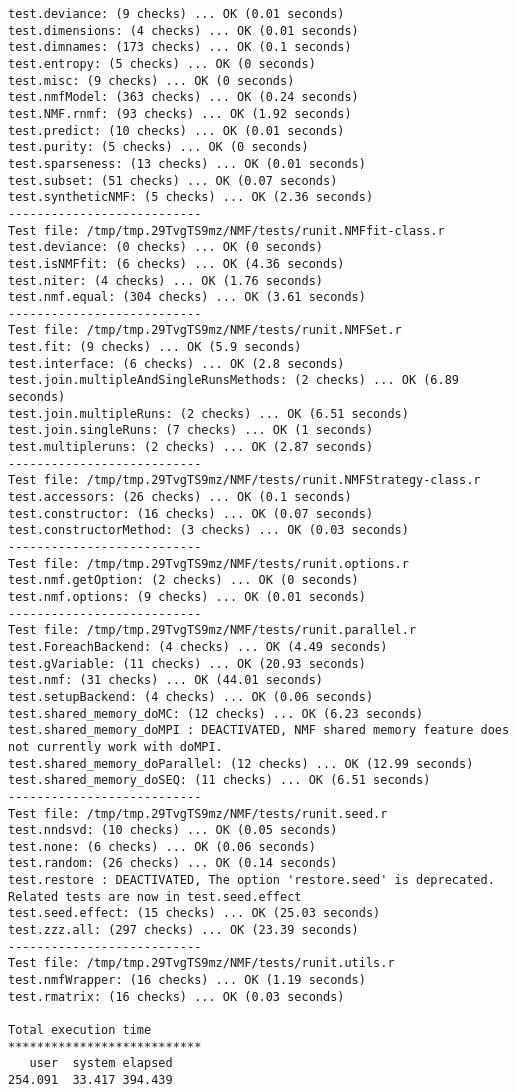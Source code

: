 \documentclass[10pt]{article}
\begin{document}
\begin{verbatim}
test.deviance: (9 checks) ... OK (0.01 seconds)
test.dimensions: (4 checks) ... OK (0.01 seconds)
test.dimnames: (173 checks) ... OK (0.1 seconds)
test.entropy: (5 checks) ... OK (0 seconds)
test.misc: (9 checks) ... OK (0 seconds)
test.nmfModel: (363 checks) ... OK (0.24 seconds)
test.NMF.rnmf: (93 checks) ... OK (1.92 seconds)
test.predict: (10 checks) ... OK (0.01 seconds)
test.purity: (5 checks) ... OK (0 seconds)
test.sparseness: (13 checks) ... OK (0.01 seconds)
test.subset: (51 checks) ... OK (0.07 seconds)
test.syntheticNMF: (5 checks) ... OK (2.36 seconds)
--------------------------- 
Test file: /tmp/tmp.29TvgTS9mz/NMF/tests/runit.NMFfit-class.r 
test.deviance: (0 checks) ... OK (0 seconds)
test.isNMFfit: (6 checks) ... OK (4.36 seconds)
test.niter: (4 checks) ... OK (1.76 seconds)
test.nmf.equal: (304 checks) ... OK (3.61 seconds)
--------------------------- 
Test file: /tmp/tmp.29TvgTS9mz/NMF/tests/runit.NMFSet.r 
test.fit: (9 checks) ... OK (5.9 seconds)
test.interface: (6 checks) ... OK (2.8 seconds)
test.join.multipleAndSingleRunsMethods: (2 checks) ... OK (6.89 seconds)
test.join.multipleRuns: (2 checks) ... OK (6.51 seconds)
test.join.singleRuns: (7 checks) ... OK (1 seconds)
test.multipleruns: (2 checks) ... OK (2.87 seconds)
--------------------------- 
Test file: /tmp/tmp.29TvgTS9mz/NMF/tests/runit.NMFStrategy-class.r 
test.accessors: (26 checks) ... OK (0.1 seconds)
test.constructor: (16 checks) ... OK (0.07 seconds)
test.constructorMethod: (3 checks) ... OK (0.03 seconds)
--------------------------- 
Test file: /tmp/tmp.29TvgTS9mz/NMF/tests/runit.options.r 
test.nmf.getOption: (2 checks) ... OK (0 seconds)
test.nmf.options: (9 checks) ... OK (0.01 seconds)
--------------------------- 
Test file: /tmp/tmp.29TvgTS9mz/NMF/tests/runit.parallel.r 
test.ForeachBackend: (4 checks) ... OK (4.49 seconds)
test.gVariable: (11 checks) ... OK (20.93 seconds)
test.nmf: (31 checks) ... OK (44.01 seconds)
test.setupBackend: (4 checks) ... OK (0.06 seconds)
test.shared_memory_doMC: (12 checks) ... OK (6.23 seconds)
test.shared_memory_doMPI : DEACTIVATED, NMF shared memory feature does not currently work with doMPI.
test.shared_memory_doParallel: (12 checks) ... OK (12.99 seconds)
test.shared_memory_doSEQ: (11 checks) ... OK (6.51 seconds)
--------------------------- 
Test file: /tmp/tmp.29TvgTS9mz/NMF/tests/runit.seed.r 
test.nndsvd: (10 checks) ... OK (0.05 seconds)
test.none: (6 checks) ... OK (0.06 seconds)
test.random: (26 checks) ... OK (0.14 seconds)
test.restore : DEACTIVATED, The option 'restore.seed' is deprecated. Related tests are now in test.seed.effect
test.seed.effect: (15 checks) ... OK (25.03 seconds)
test.zzz.all: (297 checks) ... OK (23.39 seconds)
--------------------------- 
Test file: /tmp/tmp.29TvgTS9mz/NMF/tests/runit.utils.r 
test.nmfWrapper: (16 checks) ... OK (1.19 seconds)
test.rmatrix: (16 checks) ... OK (0.03 seconds)

Total execution time
***************************
   user  system elapsed 
254.091  33.417 394.439 

\end{verbatim}
\end{document}
